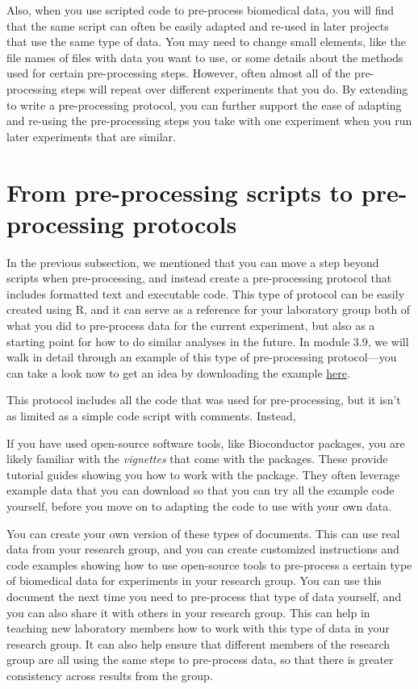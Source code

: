 \documentclass[]{tufte-book}
\begin{document}
Also, when you use scripted code to pre-process biomedical data, you will find
that the same script can often be easily adapted and re-used in later projects
that use the same type of data. You may need to change small elements, like the
file names of files with data you want to use, or some details about the methods
used for certain pre-processing steps. However, often almost all of the
pre-processing steps will repeat over different experiments that you do. By
extending to write a pre-processing protocol, you can further support the
ease of adapting and re-using the pre-processing steps you take with one
experiment when you run later experiments that are similar.

\hypertarget{from-pre-processing-scripts-to-pre-processing-protocols}{%
\section{From pre-processing scripts to pre-processing protocols}\label{from-pre-processing-scripts-to-pre-processing-protocols}}

In the previous subsection, we mentioned that you can move a step beyond scripts
when pre-processing, and instead create a pre-processing protocol that includes
formatted text and executable code. This type of protocol can be easily created
using R, and it can serve as a reference for your laboratory group both of what
you did to pre-process data for the current experiment, but also as a starting
point for how to do similar analyses in the future. In module 3.9, we will walk
in detail through an example of this type of pre-processing protocol---you can
take a look now to get an idea by downloading the example
\href{https://github.com/geanders/improve_repro/raw/master/data/bactcountr_example_data/example_protocol.pdf}{here}.

This protocol includes all the code that was used for pre-processing, but it
isn't as limited as a simple code script with comments. Instead,

If you have used open-source software tools, like Bioconductor packages, you
are likely familiar with the \emph{vignettes} that come with the packages. These
provide tutorial guides showing you how to work with the package. They often
leverage example data that you can download so that you can try all the
example code yourself, before you move on to adapting the code to use with
your own data.

You can create your own version of these types of documents. This can use
real data from your research group, and you can create customized instructions
and code examples showing how to use open-source tools to pre-process a
certain type of biomedical data for experiments in your research group.
You can use this document the next time you need to pre-process that type
of data yourself, and you can also share it with others in your research
group. This can help in teaching new laboratory members how to work with
this type of data in your research group. It can also help ensure that
different members of the research group are all using the same steps to
pre-process data, so that there is greater consistency across results from
the group.
\end{document}
